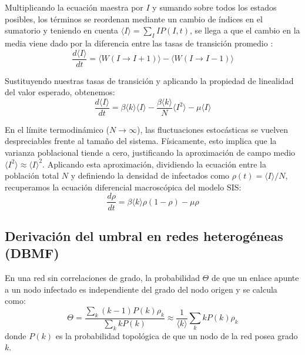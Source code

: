 \documentclass[%
reprint,
amsmath,amssymb,
aps,
]{revtex4-2}
\begin{document}
	Multiplicando la ecuación maestra por $I$ y sumando sobre todos los estados posibles, los términos se reordenan mediante un cambio de índices en el sumatorio y teniendo en cuenta $\langle I \rangle = \sum_I I P(I, t)$, se llega a que el cambio en la media viene dado por la diferencia entre las tasas de transición promedio :
	\begin{equation}
		\frac{d\langle I \rangle}{dt} = \langle W(I \to I+1) \rangle - \langle W(I \to I-1) \rangle
	\end{equation}
	
	Sustituyendo nuestras tasas de transición y aplicando la propiedad de linealidad del valor esperado, obtenemos:
	\begin{equation}
		\frac{d\langle I \rangle}{dt} = \beta \langle k \rangle \langle I \rangle - \frac{\beta \langle k \rangle}{N} \langle I^2 \rangle - \mu \langle I \rangle
	\end{equation}
	
	En el límite termodinámico ($N \to \infty$), las fluctuaciones estocásticas se vuelven despreciables frente al tamaño del sistema. Físicamente, esto implica que la varianza poblacional tiende a cero, justificando la aproximación de campo medio $\langle I^2 \rangle \approx \langle I \rangle^2$. Aplicando esta aproximación, dividiendo la ecuación entre la población total $N$ y definiendo la densidad de infectados como $\rho(t) = \langle I \rangle / N$, recuperamos la ecuación diferencial macroscópica del modelo SIS:
	\begin{equation}
		\frac{d\rho}{dt} = \beta \langle k \rangle \rho (1 - \rho) - \mu \rho
	\end{equation}
	
	\subsection{Derivación del umbral en redes heterogéneas (DBMF)}
	\label{apendice:dbmf}
	En una red sin correlaciones de grado, la probabilidad $\Theta$ de que un enlace apunte a un nodo infectado es independiente del grado del nodo origen y se calcula como:
	\begin{equation}
		\Theta = \frac{\sum_k (k-1) P(k) \rho_k}{\sum_k k P(k)} \approx \frac{1}{\langle k \rangle} \sum_k k P(k) \rho_k
	\end{equation}
	donde $P(k)$ es la probabilidad topológica de que un nodo de la red posea grado $k$.
	
\end{document}
